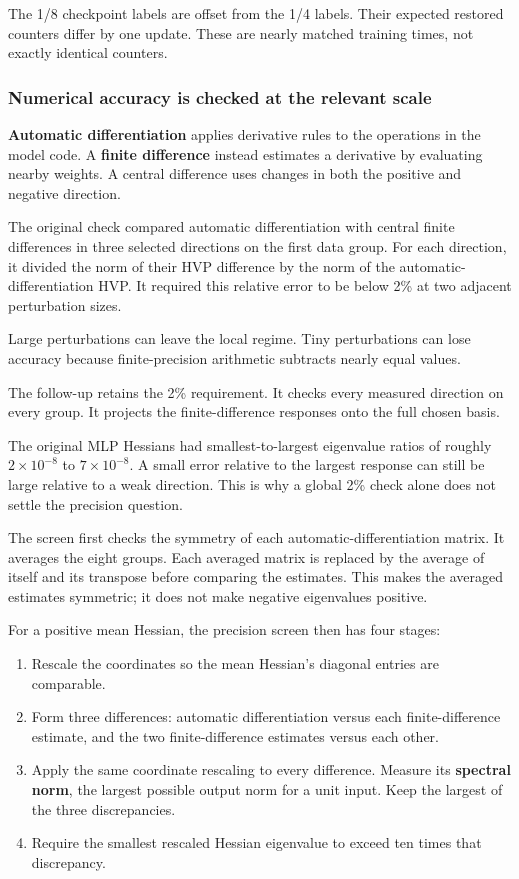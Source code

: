 \documentclass[
  14pt,
  letterpaper,
]{extarticle}
\providecommand{\tightlist}{%
  \setlength{\itemsep}{0pt}\setlength{\parskip}{0pt}}
\begin{document}
The 1/8 checkpoint labels are offset from the 1/4 labels. Their expected
restored counters differ by one update. These are nearly matched
training times, not exactly identical counters.

\subsubsection{Numerical accuracy is checked at the relevant
scale}\label{numerical-accuracy-is-checked-at-the-relevant-scale}

\textbf{Automatic differentiation} applies derivative rules to the
operations in the model code. A \textbf{finite difference} instead
estimates a derivative by evaluating nearby weights. A central
difference uses changes in both the positive and negative direction.

The original check compared automatic differentiation with central
finite differences in three selected directions on the first data group.
For each direction, it divided the norm of their HVP difference by the
norm of the automatic-differentiation HVP. It required this relative
error to be below 2\% at two adjacent perturbation sizes.

Large perturbations can leave the local regime. Tiny perturbations can
lose accuracy because finite-precision arithmetic subtracts nearly equal
values.

The follow-up retains the 2\% requirement. It checks every measured
direction on every group. It projects the finite-difference responses
onto the full chosen basis.

The original MLP Hessians had smallest-to-largest eigenvalue ratios of
roughly \(2\times10^{-8}\) to \(7\times10^{-8}\). A small error relative
to the largest response can still be large relative to a weak direction.
This is why a global 2\% check alone does not settle the precision
question.

The screen first checks the symmetry of each automatic-differentiation
matrix. It averages the eight groups. Each averaged matrix is replaced
by the average of itself and its transpose before comparing the
estimates. This makes the averaged estimates symmetric; it does not make
negative eigenvalues positive.

For a positive mean Hessian, the precision screen then has four stages:

\begin{enumerate}
\def\labelenumi{\arabic{enumi}.}
\tightlist
\item
  Rescale the coordinates so the mean Hessian's diagonal entries are
  comparable.
\item
  Form three differences: automatic differentiation versus each
  finite-difference estimate, and the two finite-difference estimates
  versus each other.
\item
  Apply the same coordinate rescaling to every difference. Measure its
  \textbf{spectral norm}, the largest possible output norm for a unit
  input. Keep the largest of the three discrepancies.
\item
  Require the smallest rescaled Hessian eigenvalue to exceed ten times
  that discrepancy.
\end{enumerate}
\end{document}
